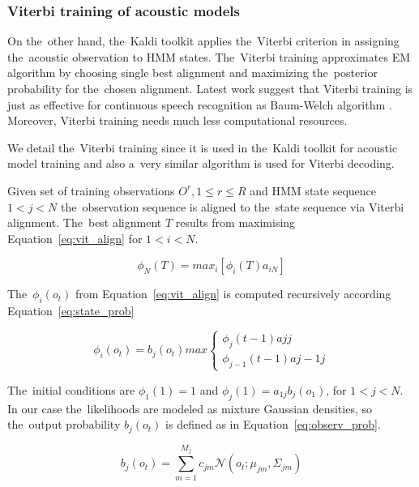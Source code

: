 \subsubsection*{Viterbi training of acoustic models}
On the~other hand, the~Kaldi toolkit applies the~Viterbi criterion in assigning the~acoustic observation to \ac{HMM} states.
The~Viterbi training approximates \ac{EM} algorithm by choosing single best alignment and maximizing the~posterior probability for the~chosen alignment.
Latest work suggest that Viterbi training is just as effective for continuous speech recognition as Baum-Welch algorithm \cite{rodriguez2003comparative}.
Moreover, Viterbi training needs much less computational resources. 

We detail the~Viterbi training since it is used in the~Kaldi toolkit for acoustic model training and also a~very similar algorithm is used for Viterbi decoding.

Given set of training observations $O^r, 1 \le r \le R$ and \ac{HMM} state sequence $1<j< N$ the~observation sequence is aligned to the~state sequence via Viterbi alignment.\cite{buthpitiya2012parallel}
The~best alignment $T$ results from maximising Equation~\ref{eq:vit_align} for $1<i< N$.

\begin{equation}\label{eq:vit_align}
    \phi_N(T)= max_i[\phi_i(T)a_{iN}] 
\end{equation}


The~$\phi_i(o_t)$ from Equation~\ref{eq:vit_align} is computed recursively according Equation~\ref{eq:state_prob}

\begin{equation}\label{eq:state_prob}
    \phi_i(o_t) = b_j(o_t) max \left\{
  \begin{array}{lr}
      \phi_j(t-1)a{jj}\\
      \phi_{j-1}(t-1)a{j-1j}
  \end{array}
\right.
\end{equation}

The~initial conditions are $\phi_1(1)=1$ and $\phi_j(1)= a_{1j}b_j(o_1)$, for $ 1 < j < N$.
In our case the~likelihoods are modeled as mixture Gaussian densities, so the~output probability $b_j(o_t)$ is defined as in Equation~\ref{eq:observ_prob}.

\begin{equation}\label{eq:observ_prob}
    b_j(o_t) = \sum_{m=1}^{M_j}{c_{jm}\mathcal{N}(o_t; \mu_{jm}, \Sigma_{jm})}
\end{equation}

